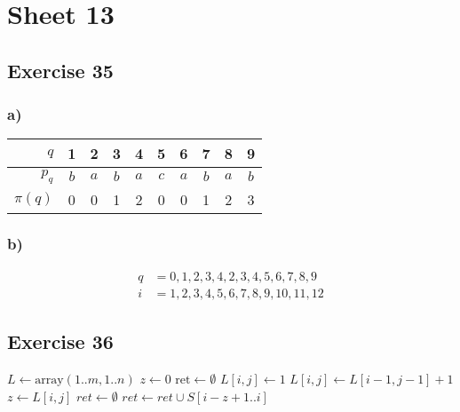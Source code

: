 \documentclass[12pt,oneside,a4paper,parskip=on,fleqn]{scrartcl}
\begin{document}
\section*{Sheet 13}

\subsection*{Exercise 35}
\subsubsection*{a)}
\begin{tabular}{|r||c|c|c|c|c|c|c|c|c|}
\hline
$q$      & 1 & 2 & 3 & 4 & 5 & 6 & 7 & 8 & 9\\\hline
$p_q$    & $b$ & $a$ & $b$ & $a$ & $c$ & $a$ & $b$ & $a$ &$b$\\\hline
$\pi(q)$ & 0 & 0 & 1 & 2 & 0 & 0 & 1 & 2 & 3\\\hline
\end{tabular}
\subsubsection*{b)}
\begin{align*}
	q &= 0,1,2,3,4,2,3,4,5,6,7,8,9\\
	i &= 1,2,3,4,5,6,7,8,9,10,11,12
\end{align*}

\subsection*{Exercise 36}
\begin{algorithmic}[1]
    \State $L \gets \mathrm{array}(1..m, 1..n)$
    \State $z \gets 0$
    \State $\mathrm{ret} \gets \emptyset$
                    \State $L[i,j] \gets 1$
                \Else
                    \State $L[i,j] \gets L[i-1,j-1] + 1$
                \EndIf
                    \State $z \gets L[i,j]$
                    \State $ret \gets \emptyset$
                \EndIf
                    \State $ret \gets ret \cup {S[i-z+1..i]}$
                \EndIf
        	\EndIf
        \EndFor
    \EndFor
    \Return
    \EndFunction
\end{algorithmic}
\end{document}
